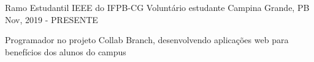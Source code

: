 
\begin{cventries}
  \cventry
    {Ramo Estudantil IEEE do IFPB-CG}
    {Voluntário estudante}
    {Campina Grande, PB}
    {Nov, 2019 - PRESENTE}
    {
      \begin{cvitems}
        \item {Programador no projeto Collab Branch, desenvolvendo aplicações web para benefícios dos alunos do campus}
      \end{cvitems}
    }
    
\end{cventries}
